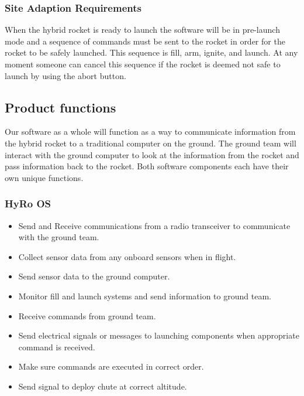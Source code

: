 \documentclass[10pt,draftclsnofoot,onecolumn,compsoc]{IEEEtran}
\begin{document}
\subsubsection{Site Adaption Requirements}
When the hybrid rocket is ready to launch the software will be in pre-launch mode and a sequence of commands must be sent to the rocket in order for the rocket to be safely launched. This sequence is fill, arm, ignite, and launch. At any moment someone can cancel this sequence if the rocket is deemed not safe to launch by using the abort button.

\subsection{ Product functions}
Our software as a whole will function as a way to communicate information from the hybrid rocket to a traditional computer on the ground. The ground team will interact with the ground computer to look at the information from the rocket and pass information back to the rocket. Both software components each have their own unique functions.

\subsubsection{HyRo OS}
\begin{itemize}
\item Send and Receive communications from a radio transceiver to communicate with the ground team.
\item Collect sensor data from any onboard sensors when in flight.
\item Send sensor data to the ground computer.
\item Monitor fill and launch systems and send information to ground team.
\item Receive commands from ground team.
\item Send electrical signals or messages to launching components when appropriate command is received.
\item Make sure commands are executed in correct order.
\item Send signal to deploy chute at correct altitude.
\end{itemize}
\end{document}
